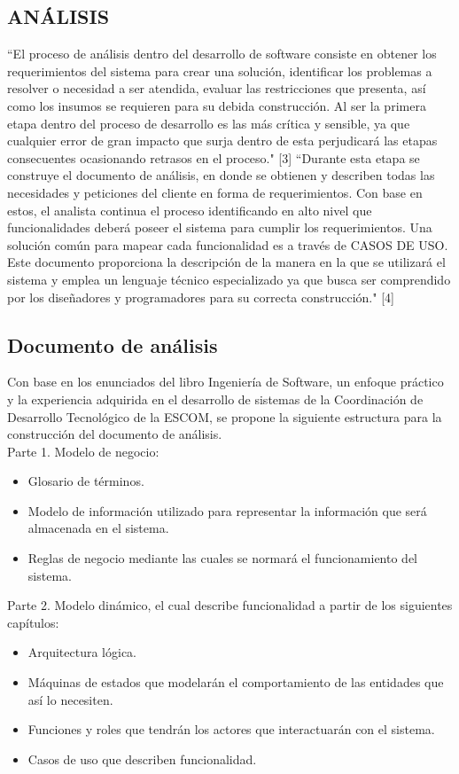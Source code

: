 \documentclass{article}
\begin{document}
\begin{multicols}{2}
	\section{ANÁLISIS}
	``El proceso de análisis dentro del desarrollo de software consiste en obtener los requerimientos del sistema para crear una solución, identificar los problemas a resolver o necesidad a ser atendida, evaluar las restricciones que presenta, así como los insumos se requieren para su debida construcción.
	Al ser la primera etapa dentro del proceso de desarrollo es las más crítica y sensible, ya que cualquier error de gran impacto que surja dentro de esta perjudicará las etapas consecuentes ocasionando retrasos en el proceso." [3] 
	\bigskip
	``Durante esta etapa se construye el documento de análisis, en donde se obtienen y describen todas las necesidades y peticiones del cliente en forma de requerimientos. Con base en estos, el analista continua el proceso identificando en alto nivel que funcionalidades deberá poseer el sistema para cumplir los requerimientos. Una solución común para mapear cada funcionalidad es a través de CASOS DE USO. Este documento proporciona la descripción de la manera en la que se utilizará el sistema y emplea un lenguaje técnico especializado ya que busca ser comprendido por los diseñadores y programadores para su correcta construcción." [4] 
	
	\subsection{Documento de análisis}
	
	Con base en los enunciados del libro Ingeniería de Software, un enfoque práctico y la experiencia adquirida en el desarrollo de sistemas de la Coordinación de Desarrollo Tecnológico de la ESCOM, se propone la siguiente estructura para la construcción del documento de análisis.\\
	
	Parte 1. Modelo de negocio:
	\begin{itemize}
		\item Glosario de términos.
		\item Modelo de información utilizado para representar la información que será almacenada en el sistema.
		\item Reglas de negocio mediante las cuales se normará el funcionamiento del sistema.
	\end{itemize}
	
	Parte 2. Modelo dinámico, el cual describe funcionalidad a partir de los siguientes capítulos:
	\begin{itemize}
		\item Arquitectura lógica.
		\item Máquinas de estados que modelarán el comportamiento de las entidades que así lo necesiten.
		\item Funciones y roles que tendrán los actores que interactuarán con el sistema.
		\item Casos de uso que describen funcionalidad.
	\end{itemize}
	

\end{multicols}
\end{document}

